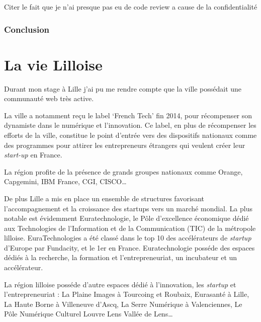\documentclass[12pt,a4paper]{article}
\begin{document}
  Citer le fait que je n'ai presque pas eu de code review a cause de la
  confidentialité

  \subsubsection{Conclusion}\label{conclusion-1}

  \newpage

  \newpage

  \section{La vie Lilloise}\label{la-vie-lilloise}

  Durant mon stage à Lille j'ai pu me rendre compte que la ville possédait
  une communauté web très active.

  \bigskip

  La ville a notamment reçu le label `French Tech' fin 2014, pour
  récompenser son dynamiste dans le numérique et l'innovation. Ce label,
  en plus de récompenser les efforts de la ville, constitue le point
  d'entrée vers des dispositifs nationaux comme des programmes pour
  attirer les entrepreneurs étrangers qui veulent créer leur
  \emph{start-up} en France.

  \bigskip

  La région profite de la présence de grands groupes nationaux comme
  Orange, Capgemini, IBM France, CGI, CISCO\ldots{}

  \bigskip

  De plus Lille a mis en place un ensemble de structures favorisant
  l'accompagnement et la croissance des startups vers un marché mondial.
  La plus notable est évidemment Euratechnologie, le Pôle d'excellence
  économique dédié aux Technologies de l'Information et de la
  Communication (TIC) de la métropole lilloise. EuraTechnologies a été
  classé dans le top 10 des accélérateurs de \emph{startup} d'Europe par
  Fundacity, et le 1er en France. Euratechnologie posséde des espaces
  dédiés à la recherche, la formation et l'entrepreneuriat, un incubateur
  et un accélérateur.

  \bigskip

  La région lilloise posséde d'autre espaces dédié à l'innovation, les
  \emph{startup} et l'entrepreneuriat : La Plaine Images à Tourcoing et
  Roubaix, Eurasanté à Lille, La Haute Borne à Villeneuve d'Ascq, La Serre
  Numérique à Valenciennes, Le Pôle Numérique Culturel Louvre Lens Vallée
  de Lens\ldots{}
\end{document}
